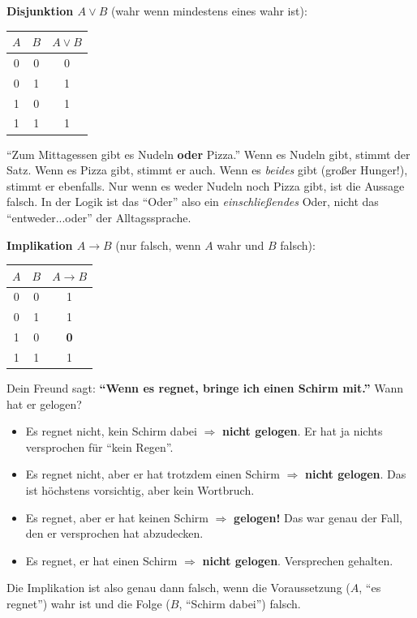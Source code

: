 \documentclass[a4paper,12pt]{article}
\begin{document}
\textbf{Disjunktion $A \vee B$} (wahr wenn mindestens eines wahr ist):

\begin{center}
\renewcommand{\arraystretch}{1.2}
\begin{tabular}{cc|c}
\toprule
$A$ & $B$ & $A \vee B$ \\
\midrule
0 & 0 & 0 \\
0 & 1 & 1 \\
1 & 0 & 1 \\
1 & 1 & 1 \\
\bottomrule
\end{tabular}
\end{center}

\begin{analogie}
"`Zum Mittagessen gibt es Nudeln \textbf{oder} Pizza."' Wenn es Nudeln
gibt, stimmt der Satz. Wenn es Pizza gibt, stimmt er auch. Wenn es
\emph{beides} gibt (gro{\ss}er Hunger!), stimmt er ebenfalls. Nur wenn
es weder Nudeln noch Pizza gibt, ist die Aussage falsch. In der Logik
ist das "`Oder"' also ein \emph{einschlie{\ss}endes} Oder, nicht das
"`entweder...oder"' der Alltagssprache.
\end{analogie}

\textbf{Implikation $A \to B$} (nur falsch, wenn $A$ wahr und $B$ falsch):

\begin{center}
\renewcommand{\arraystretch}{1.2}
\begin{tabular}{cc|c}
\toprule
$A$ & $B$ & $A \to B$ \\
\midrule
0 & 0 & 1 \\
0 & 1 & 1 \\
1 & 0 & \textbf{0} \\
1 & 1 & 1 \\
\bottomrule
\end{tabular}
\end{center}

\begin{analogie}[title={Analogie: Regenversprechen}]
Dein Freund sagt: \textbf{"`Wenn es regnet, bringe ich einen Schirm
mit."'} Wann hat er gelogen?
\begin{itemize}[nosep]
\item Es regnet nicht, kein Schirm dabei $\Rightarrow$ \textbf{nicht
      gelogen}. Er hat ja nichts versprochen f\"ur "`kein Regen"'.
\item Es regnet nicht, aber er hat trotzdem einen Schirm
      $\Rightarrow$ \textbf{nicht gelogen}. Das ist h\"ochstens
      vorsichtig, aber kein Wortbruch.
\item Es regnet, aber er hat keinen Schirm $\Rightarrow$
      \textbf{gelogen!} Das war genau der Fall, den er versprochen
      hat abzudecken.
\item Es regnet, er hat einen Schirm $\Rightarrow$
      \textbf{nicht gelogen}. Versprechen gehalten.
\end{itemize}
Die Implikation ist also genau dann falsch, wenn die Voraussetzung
($A$, "`es regnet"') wahr ist und die Folge ($B$, "`Schirm dabei"')
falsch.
\end{analogie}
\end{document}

